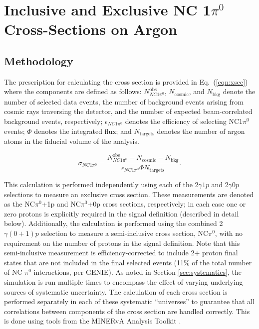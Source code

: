 \section{Inclusive and Exclusive NC 1$\pi^0$ Cross-Sections on Argon}

\subsection{Methodology} 

The prescription for calculating the cross section is provided in Eq.~(\ref{eqn:xsec}) where the components are defined as follows: $N^\text{obs}_{NC1\pi^0}$, $N_\text{cosmic}$, and $N_{\text{bkg}}$ denote the number of selected data events, the number of background events arising from cosmic rays traversing the detector, and the number of expected beam-correlated background events, respectively; $\epsilon_{NC1\pi^0}$ denotes the efficiency of selecting NC1$\pi^0$ events; $\Phi$ denotes the integrated flux; and $N_{\text{targets}}$ denotes the number of argon atoms in the fiducial volume of the analysis.

\begin{equation}
\label{eqn:xsec}
    \sigma_{NC1\pi^{0}} = \frac{N^\text{obs}_{NC1\pi^{0}}-N_{\text{cosmic}}-N_{\text{bkg}}}{\epsilon_{NC1\pi^{0}}\Phi N_{\text{targets}}}.
\end{equation} 

This calculation is performed independently using each of the 2$\gamma1p$ and 2$\gamma0p$ selections to measure an exclusive cross section. These measurements are denoted as the NC$\pi^{0}$+1p and NC$\pi^{0}$+0p cross sections, respectively; in each case one or zero protons is explicitly required in the signal definition (described in detail below). Additionally, the calculation is performed using the combined 2$\gamma(0+1)p$ selection to measure a semi-inclusive cross section, NC$\pi^{0}$, with no requirement on the number of protons in the signal definition. Note that this semi-inclusive measurement is efficiency-corrected to include 2+ proton final states that are not included in the final selected events (11\% of the total number of NC $\pi^0$ interactions, per \textsc{GENIE}). As noted in Section \ref{sec:systematics}, the simulation is run multiple times to encompass the effect of varying underlying sources of systematic uncertainty. The calculation of each cross section is performed separately in each of these systematic ``universes'' to guarantee that all correlations between components of the cross section are handled correctly. This is done using tools from the MINERvA Analysis Toolkit \cite{MINERvA:2021ddh}.

